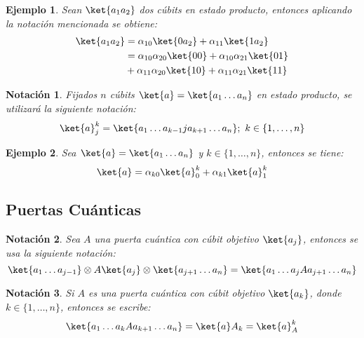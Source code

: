 \documentclass[10pt,conference,a4paper]{IEEEtran}
\newtheorem{notacion}{Notación}[subsection]
\newtheorem{ejemplo}{Ejemplo}
\begin{document}
\begin{ejemplo}
    Sean $\ket{a_1a_2}$ dos cúbits en estado producto, entonces aplicando la notación mencionada se obtiene:
    \begin{align*}
        \ket{a_1a_2}&=\alpha_{10}\ket{0a_2}+\alpha_{11}\ket{1a_2}\\
        &=\alpha_{10}\alpha_{20}\ket{00}+\alpha_{10}\alpha_{21}\ket{01}\\
        &+\alpha_{11}\alpha_{20}\ket{10}+\alpha_{11}\alpha_{21}\ket{11}
    \end{align*}
\end{ejemplo}

\begin{notacion}
    Fijados $n$ cúbits $\ket{a}=\ket{a_1\ldots a_n}$ en estado producto, se utilizará la siguiente notación:
    \begin{equation}
        \ket{a}_j^k=\ket{a_1\ldots a_{k-1}ja_{k+1}\ldots a_n};\ k\in\{1,\ldots, n\}
        \label{not:2}
    \end{equation}
\end{notacion}

\begin{ejemplo}
    Sea $\ket{a}=\ket{a_1\ldots a_n}$ y $k\in\{1,\ldots,n\}$, entonces se tiene:
    $$\ket{a}=\alpha_{k0}\ket{a}_0^k+\alpha_{k1}\ket{a}_1^k$$
\end{ejemplo}


\subsection{Puertas Cuánticas}

\begin{notacion}
    Sea $A$ una puerta cuántica con cúbit objetivo $\ket{a_j}$, entonces se usa la siguiente notación:
    \begin{equation}
        \ket{a_1\ldots a_{j-1}}\otimes A\ket{a_j}\otimes \ket{a_{j+1}\ldots a_n}=\ket{a_1\ldots a_{j}Aa_{j+1}\ldots a_n}
        \label{not:3}
    \end{equation}
\end{notacion}

\begin{notacion}
    Si $A$ es una puerta cuántica con cúbit objetivo $\ket{a_k}$, donde $k\in\{1,\ldots, n\}$, entonces se escribe:
    \begin{equation}
        \ket{a_1\ldots a_k A a_{k+1}\ldots a_n}=\ket{a}A_k=\ket{a}_A^k
        \label{not:4}
    \end{equation}
\end{notacion}
\end{document}
